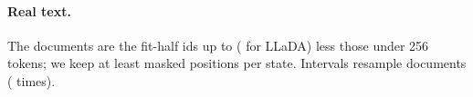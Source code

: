 \paragraph{Real text.}
The \CTwoTTenNDocs{} documents are the fit-half ids up to
\CTwoTTenLastDocId{} (\CTwoTTenLladaLastDocId{} for LLaDA) less those under 256 tokens; we keep at least \CTwoTTenMinMasked{}
masked positions per state. Intervals resample documents (\CTwoTTenNBoot{} times).




